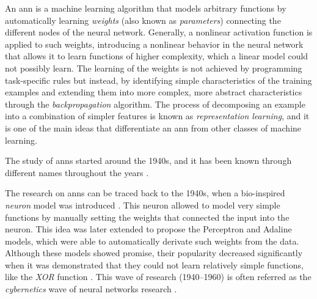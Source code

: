 

An \gls{ann} is a machine learning algorithm that models
arbitrary functions by automatically learning \emph{weights}
(also known as \emph{parameters}) connecting the different
nodes of the neural network. Generally, a nonlinear
activation function is applied to such weights, introducing
a nonlinear behavior in the neural network that allows it to
learn functions of higher complexity, which a linear model
could not possibly learn. The learning of the weights is not
achieved by programming task-specific rules but instead, by
identifying simple characteristics of the training examples
and extending them into more complex, more abstract
characteristics through the \emph{backpropagation}
algorithm. The process of decomposing an example into a
combination of simpler features is known as
\emph{representation learning}, and it is one of the main
ideas that differentiate an \gls{ann} from other classes of
machine learning.

The study of \glspl{ann} started around the 1940s, and it
has been known through different names throughout the years
\parencite{goodfellow2016deep}.

The research on \glspl{ann} can be traced back to the 1940s,
when a bio-inspired \emph{neuron} model was introduced
\parencite{mcculloch1943logical}. This neuron allowed to
model very simple functions by manually setting the weights
that connected the input into the neuron. This idea was
later extended to propose the Perceptron
\parencite{rosenblatt1958perceptron} and Adaline
\parencite{widrow1960adaptive} models, which were able to
automatically derivate such weights from the data. Although
these models showed promise, their popularity decreased
significantly when it was demonstrated that they could not
learn relatively simple functions, like the \emph{XOR}
function \parencite{minsky1972perceptrons}. This wave of
research (1940--1960) is often referred as the
\emph{cybernetics} wave of neural networks research
\parencite{goodfellow2016deep}.

